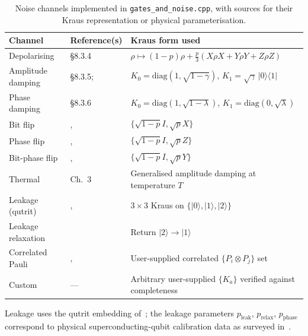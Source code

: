 \documentclass[11pt,a4paper]{article}
\begin{document}
\begin{table}[h]
\centering
\renewcommand{\arraystretch}{1.25}
\caption{Noise channels implemented in \texttt{gates\_and\_noise.cpp}, with sources for
their Kraus representation or physical parameterisation.}
\label{tab:noise-refs}
\begin{tabular}{@{}llp{7.5cm}@{}}
\toprule
\textbf{Channel} & \textbf{Reference(s)} & \textbf{Kraus form used} \\
\midrule
Depolarising         & \cite{nielsenchuang2010} \S 8.3.4 &
  $\rho\!\mapsto\!(1\!-\!p)\rho + \tfrac{p}{3}(X\rho X + Y\rho Y + Z\rho Z)$ \\
Amplitude damping    & \cite{nielsenchuang2010} \S 8.3.5; \cite{krantz2019} &
  $K_0 = \mathrm{diag}(1,\sqrt{1-\gamma})$, $K_1 = \sqrt{\gamma}\,\lvert 0\rangle\!\langle 1\rvert$ \\
Phase damping        & \cite{nielsenchuang2010} \S 8.3.6 &
  $K_0 = \mathrm{diag}(1,\sqrt{1-\lambda})$, $K_1 = \mathrm{diag}(0,\sqrt{\lambda})$ \\
Bit flip             & \cite{nielsenchuang2010}, \cite{gottesman1997} &
  $\{\sqrt{1-p}I,\sqrt{p}X\}$ \\
Phase flip           & \cite{nielsenchuang2010}, \cite{gottesman1997} &
  $\{\sqrt{1-p}I,\sqrt{p}Z\}$ \\
Bit-phase flip       & \cite{nielsenchuang2010}, \cite{gottesman1997} &
  $\{\sqrt{1-p}I,\sqrt{p}Y\}$ \\
Thermal              & \cite{breuerpetruccione2002} Ch.\ 3 &
  Generalised amplitude damping at temperature $T$ \\
Leakage (qutrit)     & \cite{mcewen2021leakage}, \cite{miao2023leakage} &
  $3 \times 3$ Kraus on $\{|0\rangle,|1\rangle,|2\rangle\}$ \\
Leakage relaxation   & \cite{mcewen2021leakage} &
  Return $|2\rangle\!\to\!|1\rangle$ \\
Correlated Pauli     & \cite{clader2021}, \cite{zhang2017correlated} &
  User-supplied correlated $\{P_i\otimes P_j\}$ set \\
Custom               & --- & Arbitrary user-supplied $\{K_a\}$ verified against completeness \\
\bottomrule
\end{tabular}
\end{table}

Leakage uses the qutrit embedding of~\cite{mcewen2021leakage}; the leakage parameters
$p_\mathrm{leak}$, $p_\mathrm{relax}$, $p_\mathrm{phase}$ correspond to physical
superconducting-qubit calibration data as surveyed in~\cite{krantz2019}.
\end{document}

